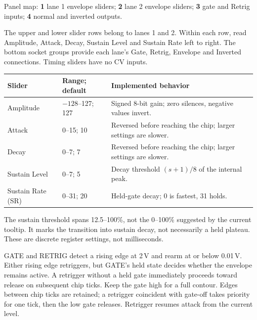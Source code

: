 Panel map: \textbf{1} lane 1 envelope sliders;
\textbf{2} lane 2 envelope sliders;
\textbf{3} gate and Retrig inputs;
\textbf{4} normal and inverted outputs.

The upper and lower slider rows belong to lanes 1 and 2. Within each row,
read Amplitude, Attack, Decay, Sustain Level and Sustain Rate left to right.
The bottom socket groups provide each lane's Gate, Retrig, Envelope and
Inverted connections. Timing sliders have no CV inputs.

\begin{tabularx}{\textwidth}{@{}l l X@{}}
\toprule Slider & Range; default & Implemented behavior \\\midrule
Amplitude & $-128$--127; 127 & Signed 8-bit gain; zero silences, negative values invert. \\
Attack & 0--15; 10 & Reversed before reaching the chip; larger settings are slower. \\
Decay & 0--7; 7 & Reversed before reaching the chip; larger settings are slower. \\
Sustain Level & 0--7; 5 & Decay threshold $(s+1)/8$ of the internal peak. \\
Sustain Rate (SR) & 0--31; 20 & Held-gate decay; 0 is fastest, 31 holds. \\
\bottomrule
\end{tabularx}

The sustain threshold spans 12.5--100\%, not the 0--100\% suggested by the
current tooltip. It marks the transition into sustain decay, not necessarily
a held plateau. These are discrete register settings, not milliseconds.

GATE and RETRIG detect a rising edge at 2\,V and rearm at or below 0.01\,V. Either
rising edge retriggers, but GATE's held state decides whether the envelope
remains active. A retrigger without a held gate immediately proceeds toward
release on subsequent chip ticks. Keep the gate high for a full contour. Edges between chip ticks are retained;
a retrigger coincident with gate-off takes priority for one tick, then the
low gate releases. Retrigger resumes attack from the current level.
